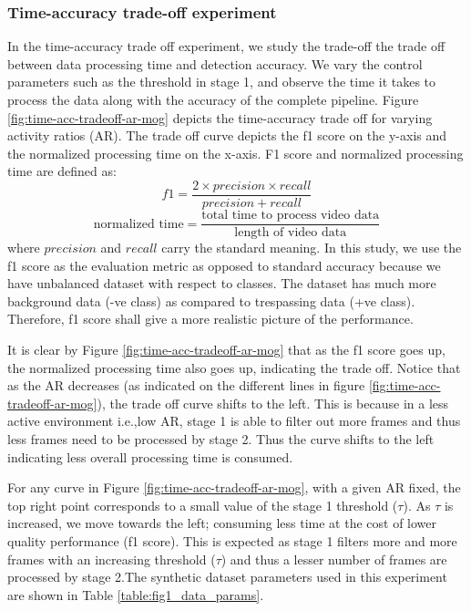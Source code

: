 \subsubsection{Time-accuracy trade-off experiment}
In the time-accuracy trade off experiment, we study the trade-off the trade off between data processing time and detection accuracy.
We vary the control parameters such as the threshold in stage 1, and observe the time it takes to process the data along with the accuracy of the complete pipeline. Figure \ref{fig:time-acc-tradeoff-ar-mog} depicts the time-accuracy trade off for varying activity ratios (AR). The trade off curve depicts the f1 score on the y-axis and the normalized processing time on the x-axis. F1 score and normalized processing time are defined as: 
$$ f1 = \frac{2 \times precision \times recall}{precision + recall}$$
$$\text{normalized time} = \frac{\text{total time to process video data}}{\text{length of video data}}$$
where $precision$ and $recall$ carry the standard meaning. In this study, we use the f1 score as the evaluation metric as opposed to standard accuracy because we have unbalanced dataset with respect to classes. The dataset has much more background data (-ve class) as compared to trespassing data (+ve class). Therefore, f1 score shall give a more realistic picture of the performance. 

It is clear by Figure \ref{fig:time-acc-tradeoff-ar-mog} that as the f1 score goes up, the normalized processing time also goes up, indicating the trade off. Notice that as the AR decreases (as indicated on the different lines in figure \ref{fig:time-acc-tradeoff-ar-mog}), the trade off curve shifts to the left. This is because in a less active environment i.e.,low AR, stage 1 is able to filter out more frames and thus less frames need to be processed by stage 2. Thus the curve shifts to the left indicating less overall processing time is consumed.   

For any curve in Figure \ref{fig:time-acc-tradeoff-ar-mog}, with a given AR fixed, the top right point corresponds to a small value of the stage 1 threshold ($\tau$). As $\tau$ is increased, we move towards the left; consuming less time at the cost of lower quality performance (f1 score). This is expected as stage 1 filters more and more frames with an increasing threshold ($\tau$) and thus a lesser number of frames are processed by stage 2.The synthetic dataset parameters used in this experiment are shown in Table \ref{table:fig1_data_params}. 

